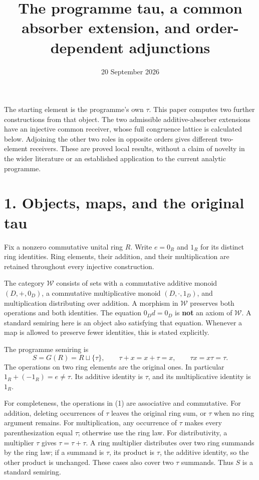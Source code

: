 \documentclass[
]{article}
\title{The programme tau, a common absorber extension, and
order-dependent adjunctions}
\author{}
\date{20 September 2026}
\begin{document}
\maketitle

{
\setcounter{tocdepth}{3}
\tableofcontents
}
The starting element is the programme's own \(\tau\). This paper
computes two further constructions from that object. The two admissible
additive-absorber extensions have an injective common receiver, whose
full congruence lattice is calculated below. Adjoining the other two
roles in opposite orders gives different two-element receivers. These
are proved local results, without a claim of novelty in the wider
literature or an established application to the current analytic
programme.

\section{1. Objects, maps, and the original
tau}\label{objects-maps-and-the-original-tau}

Fix a nonzero commutative unital ring \(R\). Write \(e=0_R\) and \(1_R\)
for its distinct ring identities. Ring elements, their addition, and
their multiplication are retained throughout every injective
construction.

The category \(\mathcal W\) consists of sets with a commutative additive
monoid \((D,+,0_D)\), a commutative multiplicative monoid
\((D,\cdot,1_D)\), and multiplication distributing over addition. A
morphism in \(\mathcal W\) preserves both operations and both
identities. The equation \(0_Dd=0_D\) is \textbf{not} an axiom of
\(\mathcal W\). A standard semiring here is an object also satisfying
that equation. Whenever a map is allowed to preserve fewer identities,
this is stated explicitly.

The programme semiring is \[
S=G(R)=R\sqcup\{\tau\},\qquad
\tau+x=x+\tau=x,\qquad \tau x=x\tau=\tau.
\tag{1}
\] The operations on two ring elements are the original ones. In
particular \(1_R+(-1_R)=e\ne\tau\). Its additive identity is \(\tau\),
and its multiplicative identity is \(1_R\).

For completeness, the operations in (1) are associative and commutative.
For addition, deleting occurrences of \(\tau\) leaves the original ring
sum, or \(\tau\) when no ring argument remains. For multiplication, any
occurrence of \(\tau\) makes every parenthesization equal \(\tau\);
otherwise use the ring law. For distributivity, a multiplier \(\tau\)
gives \(\tau=\tau+\tau\). A ring multiplier distributes over two ring
summands by the ring law; if a summand is \(\tau\), its product is
\(\tau\), the additive identity, so the other product is unchanged.
These cases also cover two \(\tau\) summands. Thus \(S\) is a standard
semiring.
\end{document}
